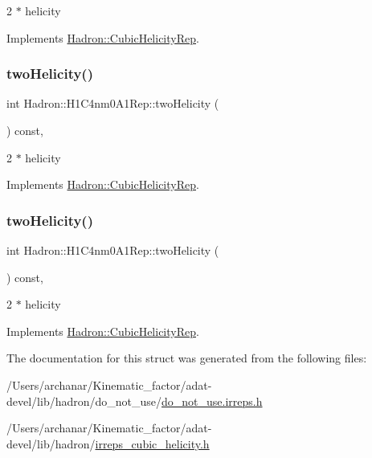 2 $\ast$ helicity 

Implements \mbox{\hyperlink{structHadron_1_1CubicHelicityRep_af507aa56fc2747eacc8cb6c96db31ecc}{Hadron\+::\+Cubic\+Helicity\+Rep}}.

\mbox{\label{structHadron_1_1H1C4nm0A1Rep_a878150ec7ce5bf97a9d20d5cf82a16a9}} 
\subsubsection{\texorpdfstring{twoHelicity()}{twoHelicity()}\hspace{0.1cm}{\footnotesize\ttfamily [2/3]}}
{\footnotesize\ttfamily int Hadron\+::\+H1\+C4nm0\+A1\+Rep\+::two\+Helicity (\begin{DoxyParamCaption}{ }\end{DoxyParamCaption}) const\hspace{0.3cm}{\ttfamily [inline]}, {\ttfamily [virtual]}}

2 $\ast$ helicity 

Implements \mbox{\hyperlink{structHadron_1_1CubicHelicityRep_af507aa56fc2747eacc8cb6c96db31ecc}{Hadron\+::\+Cubic\+Helicity\+Rep}}.

\mbox{\label{structHadron_1_1H1C4nm0A1Rep_a878150ec7ce5bf97a9d20d5cf82a16a9}} 
\subsubsection{\texorpdfstring{twoHelicity()}{twoHelicity()}\hspace{0.1cm}{\footnotesize\ttfamily [3/3]}}
{\footnotesize\ttfamily int Hadron\+::\+H1\+C4nm0\+A1\+Rep\+::two\+Helicity (\begin{DoxyParamCaption}{ }\end{DoxyParamCaption}) const\hspace{0.3cm}{\ttfamily [inline]}, {\ttfamily [virtual]}}

2 $\ast$ helicity 

Implements \mbox{\hyperlink{structHadron_1_1CubicHelicityRep_af507aa56fc2747eacc8cb6c96db31ecc}{Hadron\+::\+Cubic\+Helicity\+Rep}}.



The documentation for this struct was generated from the following files\+:\begin{DoxyCompactItemize}
\item 
/\+Users/archanar/\+Kinematic\+\_\+factor/adat-\/devel/lib/hadron/do\+\_\+not\+\_\+use/\mbox{\hyperlink{adat-devel_2lib_2hadron_2do__not__use_2do__not__use_8irreps_8h}{do\+\_\+not\+\_\+use.\+irreps.\+h}}\item 
/\+Users/archanar/\+Kinematic\+\_\+factor/adat-\/devel/lib/hadron/\mbox{\hyperlink{adat-devel_2lib_2hadron_2irreps__cubic__helicity_8h}{irreps\+\_\+cubic\+\_\+helicity.\+h}}\end{DoxyCompactItemize}
